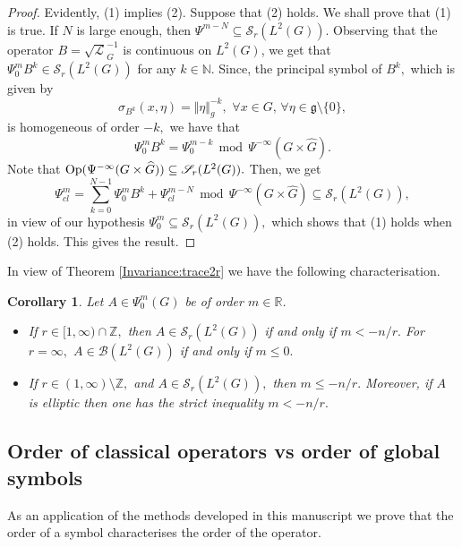 \documentclass[12pt, reqno]{amsart}
\newtheorem{corollary}[theorem]{Corollary}
\theoremstyle{definition}
\theoremstyle{remark}
\numberwithin{equation}{section}
\begin{document}
\begin{proof}
Evidently, (1) implies (2). Suppose that (2) holds.
We shall prove that (1) is true. If $N$ is large enough,
then $\Psi ^{m-N}\subseteq \mathscr{S}_r(L^2(G))$. Observing that the operator $B=\sqrt{\mathcal{L}}_G^{-1}$ is continuous on $L^2(G)$, 
we get that $\Psi _0^mB^k\in \mathscr{S}_r(L^2(G))$ for any $k\in \mathbb{N}$. Since, the principal symbol of $B^{k},$ which is given by $$\sigma_{B^k}(x,\eta)=\Vert \eta\Vert_{g}^{-k},\,\,\forall x\in G,\,\forall \eta\in \mathfrak{g}\setminus \{0\},$$   is homogeneous of order $-k,$ we have that
$$
\Psi _0^mB^k = \Psi _0^{m-k}\, 
\operatorname{mod}\, \Psi^{-\infty}
(G\times \widehat G).
$$
Note that $\textnormal{Op}(\Psi^{-\infty} (G\times \widehat G))\subseteq \mathscr{S}_r(L^2(G)).$ Then, we get
$$
\Psi _{cl}^m = \sum _{k=0}^{N-1}\Psi _0^mB^k
+ \Psi _{cl}^{m-N}\, 
\operatorname{mod}\, \Psi^{-\infty}
(G\times \widehat G)
\subseteq \mathscr{S}_r(L^2(G)),
$$ in view of our hypothesis  $\Psi ^m_0\subseteq \mathscr{S}_r(L^2(G)),$
which shows that (1) holds when (2) holds. This
gives the result.
\end{proof}

In view of Theorem \ref{Invariance:trace2r} we have the following characterisation.
\begin{corollary}\label{Invariance:trace2r:cor} Let $A\in \Psi^{m}_{0}(G)$ be of order $m\in \mathbb{R}$.
\begin{itemize}
    \item[(A).] If $r\in [1,\infty)\cap \mathbb{Z},$ then
$A\in \mathscr{S}_r(L^2(G))$ if and only if $m<-n/r.$ For $r=\infty,$     $A\in \mathscr{B}(L^2(G))$ if and only if $m\leq 0.$ 
\item[(B).] If $r\in (1,\infty)\setminus \mathbb{Z},$ and   $A\in \mathscr{S}_{r}(L^2(G)),$ then $m\leq -n/r.$ Moreover, if $A$ is elliptic then one has the strict inequality $m<-n/r.$
\end{itemize}
\end{corollary}



\subsection{Order of classical operators vs order of global symbols}\label{Last:Subsection}
As an application of the methods developed in this manuscript we prove that the order of a symbol characterises the order of the operator. 
\end{document}
